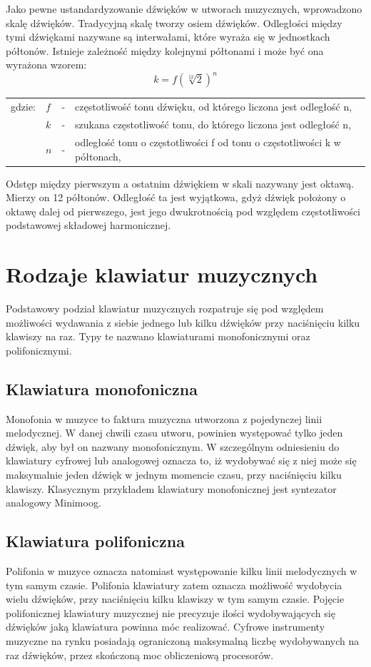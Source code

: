 Jako pewne ustandardyzowanie dźwięków w utworach muzycznych, wprowadzono skalę dźwięków. Tradycyjną skalę tworzy osiem dźwięków. Odległości między tymi dźwiękami nazywane są interwałami, które wyraża się w jednostkach półtonów. Istnieje zależność między kolejnymi półtonami i może być ona wyrażona wzorem:
\begin{equation} \label{equ:idft}
k = f(\sqrt[12]{2})^{n}
\end{equation}
\begin{tabular}{ l l l l}
	gdzie: 	&	$f$ & - &  częstotliwość tonu dźwięku, od którego liczona jest odległość n, \\
	&	$k$ & - &  szukana częstotliwość tonu, do którego liczona jest odległość n, \\
	&   $n$ &  - & odległość tonu o częstotliwości f od tonu o częstotliwości k w półtonach, \\
\end{tabular}

Odstęp między pierwszym a ostatnim dźwiękiem w skali nazywany jest oktawą. Mierzy on 12 półtonów. Odległość ta jest wyjątkowa, gdyż dźwięk położony o oktawę dalej od pierwszego, jest jego dwukrotnością pod względem częstotliwości podstawowej składowej harmonicznej.



\section{Rodzaje klawiatur muzycznych}
Podstawowy podział klawiatur muzycznych rozpatruje się pod względem możliwości wydawania z siebie jednego lub kilku dźwięków przy naciśnięciu kilku klawiszy na raz. Typy te nazwano klawiaturami monofonicznymi oraz polifonicznymi.

\subsection{Klawiatura monofoniczna}
Monofonia w muzyce to faktura muzyczna utworzona z pojedynczej linii melodycznej. W danej chwili czasu utworu, powinien występować tylko jeden dźwięk, aby był on nazwany monofonicznym. W szczególnym odniesieniu do klawiatury cyfrowej lub analogowej oznacza to, iż wydobywać się z niej może się maksymalnie jeden dźwięk w jednym momencie czasu, przy naciśnięciu kilku klawiszy. Klasycznym przykładem klawiatury monofonicznej jest syntezator analogowy Minimoog.

\subsection{Klawiatura polifoniczna}
Polifonia w muzyce oznacza natomiast występowanie kilku linii melodycznych w tym samym czasie. Polifonia klawiatury zatem oznacza możliwość wydobycia wielu dźwięków, przy naciśnięciu kilku klawiszy w tym samym czasie. Pojęcie polifonicznej klawiatury muzycznej nie precyzuje ilości wydobywających się dźwięków jaką klawiatura powinna móc realizować. Cyfrowe instrumenty muzyczne na rynku posiadają ograniczoną maksymalną liczbę wydobywanych na raz dźwięków, przez skończoną moc obliczeniową procesorów.

